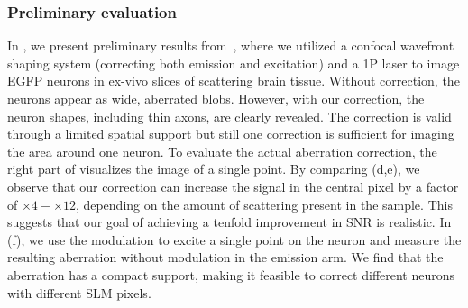
\subsubsection{Preliminary evaluation}
In , we present preliminary results from~\cite{DrorNatureComm24}, where we utilized a confocal wavefront shaping system (correcting both emission and excitation) and a 1P laser to image EGFP neurons in ex-vivo slices of scattering brain tissue. Without correction, the neurons appear as wide, aberrated blobs. However, with our correction, the neuron shapes, including thin axons, are clearly revealed. The correction is valid through a limited spatial support but still one correction is sufficient for imaging the area around one neuron. 
To evaluate the actual aberration correction, the right part of  visualizes the image of a single point. By comparing (d,e), we observe that our correction can increase the signal in the central pixel by a factor of  $\times4-\times 12$, depending on the amount of scattering present in the sample. This suggests that our goal of achieving a tenfold improvement in SNR is realistic.
In (f), we use the modulation to excite a single point on the neuron and measure the resulting aberration without modulation in the emission arm. We find that the aberration has a compact support, making it feasible to correct different neurons with different SLM pixels.




